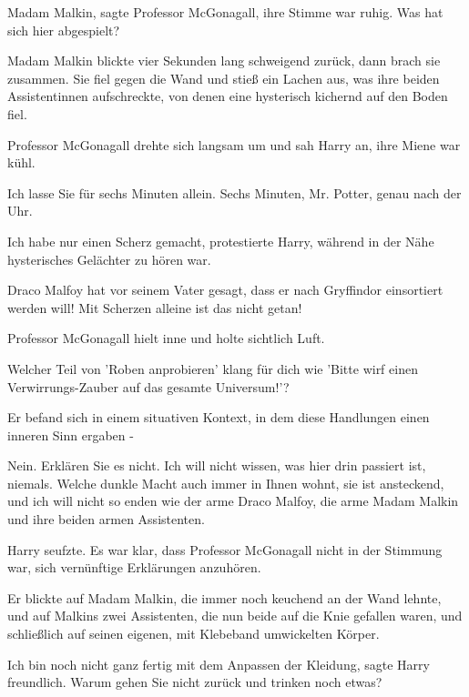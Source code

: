 \glqq{}Madam Malkin\grqq{}, sagte Professor McGonagall, ihre Stimme war ruhig.
\glqq{}Was hat sich hier abgespielt?\grqq{}

Madam Malkin blickte vier Sekunden lang schweigend zurück, dann brach sie
zusammen. Sie fiel gegen die Wand und stieß ein Lachen aus, was ihre beiden
Assistentinnen aufschreckte, von denen eine hysterisch kichernd auf den Boden
fiel.

Professor McGonagall drehte sich langsam um und sah Harry an, ihre Miene war
kühl.

\glqq{}Ich lasse Sie für sechs Minuten allein. Sechs Minuten, Mr. Potter, genau
nach der Uhr.\grqq{}

\glqq{}Ich habe nur einen Scherz gemacht\grqq{}, protestierte Harry, während in
der Nähe hysterisches Gelächter zu hören war.

\glqq{}Draco Malfoy hat vor seinem Vater gesagt, dass er nach Gryffindor
einsortiert werden will! Mit Scherzen alleine ist das nicht getan!\grqq{}

Professor McGonagall hielt inne und holte sichtlich Luft.

\glqq{}Welcher Teil von 'Roben anprobieren' klang für dich wie 'Bitte wirf einen
Verwirrungs-Zauber auf das gesamte Universum!'?\grqq{}

\glqq{}Er befand sich in einem situativen Kontext, in dem diese Handlungen einen
inneren Sinn ergaben -\grqq{}

\glqq{}Nein. Erklären Sie es nicht. Ich will nicht wissen, was hier drin passiert
ist, niemals. Welche dunkle Macht auch immer in Ihnen wohnt, sie ist ansteckend,
und ich will nicht so enden wie der arme Draco Malfoy, die arme Madam Malkin und
ihre beiden armen Assistenten.\grqq{}

Harry seufzte. Es war klar, dass Professor McGonagall nicht in der Stimmung war,
sich vernünftige Erklärungen anzuhören.

Er blickte auf Madam Malkin, die immer noch keuchend an der Wand lehnte, und auf
Malkins zwei Assistenten, die nun beide auf die Knie gefallen waren, und
schließlich auf seinen eigenen, mit Klebeband umwickelten Körper.

\glqq{}Ich bin noch nicht ganz fertig mit dem Anpassen der Kleidung\grqq{}, sagte
Harry freundlich. \glqq{}Warum gehen Sie nicht zurück und trinken noch
etwas?\grqq{}
